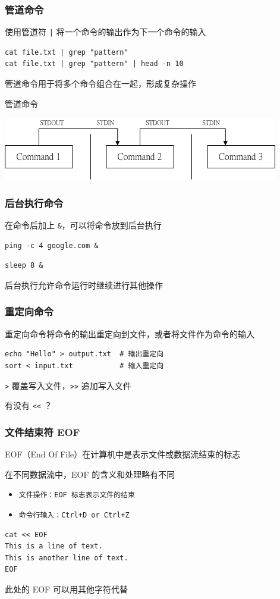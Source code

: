 \documentclass[UTF8, 16pt]{beamer}
\begin{document}
\begin{frame}[fragile]
    \frametitle{管道命令}

    使用管道符 \texttt{|} 将一个命令的输出作为下一个命令的输入
    \begin{lstlisting}
cat file.txt | grep "pattern"
cat file.txt | grep "pattern" | head -n 10\end{lstlisting}
    管道命令用于将多个命令组合在一起，形成复杂操作
\end{frame}

\begin{frame}
    \centering
    \textcolor{sufered}{管道命令}

    \includegraphics[width=0.95\linewidth]{shell/pipe.png}
\end{frame}

\begin{frame}[fragile]
    \frametitle{后台执行命令}

    在命令后加上 \texttt{\&}，可以将命令放到后台执行
    \begin{lstlisting}[numbers=none]
ping -c 4 google.com &\end{lstlisting}
    \begin{lstlisting}[numbers=none]
sleep 8 &\end{lstlisting}
    后台执行允许命令运行时继续进行其他操作
\end{frame}

\begin{frame}[fragile]
    \frametitle{重定向命令}

    重定向命令将命令的输出重定向到文件，或者将文件作为命令的输入
    \begin{lstlisting}
echo "Hello" > output.txt  # 输出重定向
sort < input.txt           # 输入重定向\end{lstlisting}
    \texttt{>} 覆盖写入文件，\texttt{>>} 追加写入文件

    有没有 \texttt{<<} ？
\end{frame}

\begin{frame}[fragile]
    \frametitle{文件结束符 EOF}

    EOF（End Of File）在计算机中是表示文件或数据流结束的标志

    在不同数据流中，EOF 的含义和处理略有不同
    \begin{itemize}
        \item \texttt{文件操作：EOF 标志表示文件的结束}
        \item \texttt{命令行输入：Ctrl+D or Ctrl+Z}
    \end{itemize}
    \begin{lstlisting}
cat << EOF
This is a line of text.
This is another line of text.
EOF\end{lstlisting}
    此处的 EOF 可以用其他字符代替
\end{frame}
\end{document}
